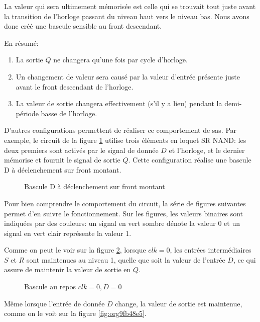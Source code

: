 \documentclass[letter, oneside]{book}
\begin{document}
\begin{enumerate}
La valeur qui sera ultimement mémorisée est celle qui se trouvait tout
juste avant la transition de l'horloge passant du niveau haut vers le
niveau bas. Nous avons donc créé une bascule sensible au front
descendant.

En résumé:
\begin{enumerate}
\item La sortie \(Q\) ne changera qu'une fois par cycle d'horloge.
\item Un changement de valeur sera causé par la valeur d'entrée présente
juste avant le front descendant de l'horloge.
\item La valeur de sortie changera effectivement (s'il y a lieu) pendant
la demi-période basse de l'horloge.
\end{enumerate}

D'autres configurations permettent de réaliser ce comportement de
sas. Par exemple, le circuit de la figure \ref{fig:org9abcbf6} utilise
trois éléments en loquet SR NAND: les deux premiers sont activés par
le signal de donnée \(D\) et l'horloge, et le dernier mémorise et
fournit le signal de sortie \(Q\). Cette configuration réalise une
bascule D à déclenchement sur front montant.

\begin{figure}[htbp]
\centering

\caption{\label{fig:org9abcbf6}Bascule D à déclenchement sur front montant}
\end{figure}

Pour bien comprendre le comportement du circuit, la série de figures
suivantes permet d'en suivre le fonctionnement. Sur les figures,
les valeurs binaires sont indiquées par des couleurs: un signal en
vert sombre dénote la valeur 0 et un signal en vert clair représente
la valeur 1.

Comme on peut le voir sur la figure \ref{fig:orge4c2e1e}, lorsque \(clk = 0\), les
entrées intermédiaires \(S\) et \(R\) sont maintenues au niveau 1,
quelle que soit la valeur de l'entrée \(D\), ce qui assure de
maintenir la valeur de sortie en \(Q\).

\begin{figure}[htbp]
\centering

\caption{\label{fig:orge4c2e1e}Bascule au repos  \(clk = 0, D=0\)}
\end{figure}

Même lorsque l'entrée de donnée \(D\) change, la valeur de sortie est
maintenue, comme on le voit sur la figure \ref{fig:org9fb48e5}.


\end{enumerate}
\end{document}
